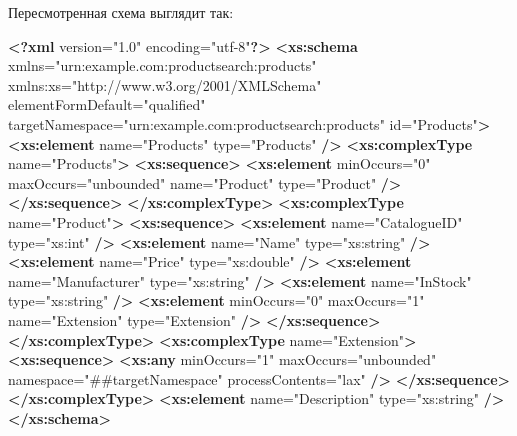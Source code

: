 \documentclass[11pt]{article}
\newenvironment{Shaded}{}{}
\newcommand{\KeywordTok}[1]{\textcolor[rgb]{0.00,0.44,0.13}{\textbf{{#1}}}}
\newcommand{\StringTok}[1]{\textcolor[rgb]{0.25,0.44,0.63}{{#1}}}
\newcommand{\OtherTok}[1]{\textcolor[rgb]{0.00,0.44,0.13}{{#1}}}
\newcommand{\NormalTok}[1]{{#1}}
\begin{document}
Пересмотренная схема выглядит так:

\begin{Shaded}
\begin{Highlighting}[]
\KeywordTok{<?xml}\NormalTok{ version="1.0" encoding="utf-8"}\KeywordTok{?>}
\KeywordTok{<xs:schema}\OtherTok{ xmlns=}\StringTok{"urn:example.com:productsearch:products"} 
\OtherTok{  xmlns:xs=}\StringTok{"http://www.w3.org/2001/XMLSchema"}
\OtherTok{  elementFormDefault=}\StringTok{"qualified"} 
\OtherTok{  targetNamespace=}\StringTok{"urn:example.com:productsearch:products"} 
\OtherTok{  id=}\StringTok{"Products"}\KeywordTok{>}
  \KeywordTok{<xs:element}\OtherTok{ name=}\StringTok{"Products"}\OtherTok{ type=}\StringTok{"Products"} \KeywordTok{/>}
  \KeywordTok{<xs:complexType}\OtherTok{ name=}\StringTok{"Products"}\KeywordTok{>}
    \KeywordTok{<xs:sequence>}
      \KeywordTok{<xs:element}\OtherTok{ minOccurs=}\StringTok{"0"}\OtherTok{ maxOccurs=}\StringTok{"unbounded"}\OtherTok{ name=}\StringTok{"Product"}\OtherTok{ type=}\StringTok{"Product"} \KeywordTok{/>}
    \KeywordTok{</xs:sequence>}
  \KeywordTok{</xs:complexType>}
  \KeywordTok{<xs:complexType}\OtherTok{ name=}\StringTok{"Product"}\KeywordTok{>}
    \KeywordTok{<xs:sequence>}
      \KeywordTok{<xs:element}\OtherTok{ name=}\StringTok{"CatalogueID"}\OtherTok{ type=}\StringTok{"xs:int"} \KeywordTok{/>}
      \KeywordTok{<xs:element}\OtherTok{ name=}\StringTok{"Name"}\OtherTok{ type=}\StringTok{"xs:string"} \KeywordTok{/>}
      \KeywordTok{<xs:element}\OtherTok{ name=}\StringTok{"Price"}\OtherTok{ type=}\StringTok{"xs:double"} \KeywordTok{/>}
      \KeywordTok{<xs:element}\OtherTok{ name=}\StringTok{"Manufacturer"}\OtherTok{ type=}\StringTok{"xs:string"} \KeywordTok{/>}
      \KeywordTok{<xs:element}\OtherTok{ name=}\StringTok{"InStock"}\OtherTok{ type=}\StringTok{"xs:string"} \KeywordTok{/>}
      \KeywordTok{<xs:element}\OtherTok{ minOccurs=}\StringTok{"0"}\OtherTok{ maxOccurs=}\StringTok{"1"}\OtherTok{ name=}\StringTok{"Extension"}\OtherTok{ type=}\StringTok{"Extension"} \KeywordTok{/>}
    \KeywordTok{</xs:sequence>}
  \KeywordTok{</xs:complexType>}
  \KeywordTok{<xs:complexType}\OtherTok{ name=}\StringTok{"Extension"}\KeywordTok{>}
    \KeywordTok{<xs:sequence>}
      \KeywordTok{<xs:any}\OtherTok{ minOccurs=}\StringTok{"1"}\OtherTok{ maxOccurs=}\StringTok{"unbounded"}\OtherTok{ namespace=}\StringTok{"##targetNamespace"}\OtherTok{ processContents=}\StringTok{"lax"} \KeywordTok{/>}
    \KeywordTok{</xs:sequence>}
  \KeywordTok{</xs:complexType>}
  \KeywordTok{<xs:element}\OtherTok{ name=}\StringTok{"Description"}\OtherTok{ type=}\StringTok{"xs:string"} \KeywordTok{/>}
\KeywordTok{</xs:schema>}
\end{Highlighting}
\end{Shaded}
\end{document}
